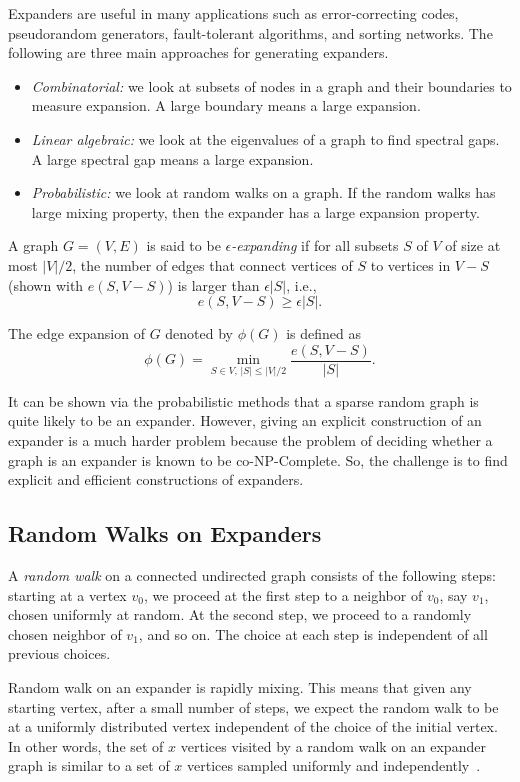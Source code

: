 \documentclass[10pt]{article}
\theoremstyle{plain}
\begin{document}
Expanders are useful in many applications such as error-correcting
codes, pseudorandom generators, fault-tolerant algorithms, and sorting
networks. The following are three main approaches for generating expanders.
\begin{itemize}
	\item \emph{Combinatorial:} we look at subsets of nodes in a graph and their
	boundaries to measure expansion. A large boundary means a large expansion.
	\item \emph{Linear algebraic:} we look at the eigenvalues of a graph to
	find spectral gaps. A large spectral gap means a large expansion.
	\item \emph{Probabilistic:} we look at random walks on a graph. If the random
	walks has large mixing property, then the expander has a large expansion
	property.
\end{itemize}
A graph $G=(V,E)$ is said to be $\epsilon$\emph{-expanding }if for
all subsets $S$ of $V$ of size at most $|V|/2$, the number of edges
that connect vertices of $S$ to vertices in $V-S$ (shown with $e(S,V-S)$)
is larger than $\epsilon|S|$, i.e.,
\[
e(S,V-S)\geq\epsilon|S|.
\]

The edge expansion of $G$ denoted by $\phi(G)$ is defined as
\[
\phi(G)=\min_{S\in V,\,|S|\leq|V|/2}\frac{e(S,V-S)}{|S|}.
\]

It can be shown via the probabilistic methods that a sparse random
graph is quite likely to be an expander. However, giving an explicit
construction of an expander is a much harder problem because the problem
of deciding whether a graph is an expander is known to be co-NP-Complete.
So, the challenge is to find explicit and efficient constructions
of expanders. %


\subsection{Random Walks on Expanders}

A \emph{random walk} on a connected undirected graph consists of the
following steps: starting at a vertex $v_{0}$, we proceed at the
first step to a neighbor of $v_{0}$, say $v_{1}$, chosen uniformly
at random. At the second step, we proceed to a randomly chosen neighbor
of $v_{1}$, and so on. The choice at each step is independent of
all previous choices.

Random walk on an expander is rapidly mixing. This means that given
any starting vertex, after a small number of steps, we expect the
random walk to be at a uniformly distributed vertex independent of
the choice of the initial vertex. In other words, the set of $x$
vertices visited by a random walk on an expander graph is similar
to a set of $x$ vertices sampled uniformly and independently~\cite{Hoory:2006:Expanders}.
\end{document}
